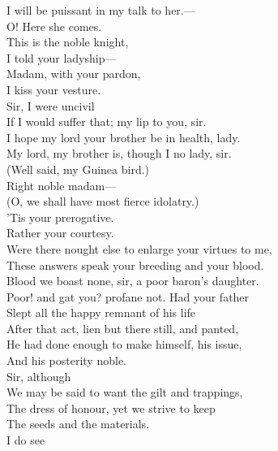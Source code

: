 \documentclass[a4paper,oneside,12pt]{memoir}
\begin{document}
\begin{drama*}
I will be puissant in my talk to her.---\\
O! Here she comes.\\
\facespeaks {} This is the noble knight,\\
I told your ladyship---\\
\mammonspeaks {} Madam, with your pardon,\\
I kiss your vesture.\\
\dolspeaks {} Sir, I were uncivil\\
If I would suffer that; my lip to you, sir.\\
\mammonspeaks I hope my lord your brother be in health, lady.\\
\dolspeaks My lord, my brother is, though I no lady, sir.\\
\facespeaks (Well said, my Guinea bird.)\\
\mammonspeaks {} Right noble madam---\\
\facespeaks (O, we shall have most fierce idolatry.)\\
\mammonspeaks 'Tis your prerogative.\\
\dolspeaks {} Rather your courtesy.\\
\mammonspeaks Were there nought else to enlarge your virtues to me,\\
These answers speak your breeding and your blood.\\
\dolspeaks Blood we boast none, sir, a poor baron's daughter.\\
\mammonspeaks Poor! and gat you? profane not. Had your father\\
Slept all the happy remnant of his life\\
After that act, lien but there still, and panted,\\
He had done enough to make himself, his issue,\\
And his posterity noble.\\
\dolspeaks {} Sir, although\\
We may be said to want the gilt and trappings,\\
The dress of honour, yet we strive to keep\\
The seeds and the materials.\\
\mammonspeaks {} I do see\\

\end{drama*}
\end{document}

